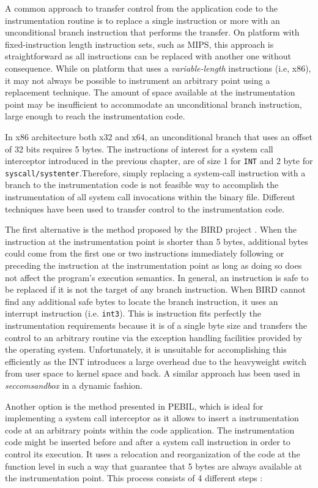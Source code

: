 
A common approach to transfer control from the application code to the instrumentation routine is to replace a single instruction or more with an unconditional branch instruction that performs the transfer. On platform with fixed-instruction length instruction sets, such as MIPS, this approach is straightforward as all instructions can be replaced with another one without consequence. While on platform that uses a \emph{variable-length} instructions (i.e, x86), it may not always be possible to instrument an arbitrary point using a replacement technique. The amount of space available at the instrumentation point may be insufficient to accommodate an unconditional branch instruction, large enough to reach the instrumentation code. 

In x86 architecture both x32 and x64, an unconditional branch that uses an offset of 32 bits requires 5 bytes. The instructions of interest for a system call interceptor introduced in the previous chapter, are of size 1 for \lstinline$INT$ and 2 byte for \lstinline$syscall/systenter$.Therefore, simply replacing a system-call instruction with a branch to the instrumentation code is not feasible way to accomplish the instrumentation of all system call invocations  within the binary file. Different techniques have been used to transfer control to the instrumentation code. 

The first alternative is the method proposed by the BIRD project \cite{BIRD}. When the instruction at the instrumentation point is shorter than 5 bytes, additional bytes could come from the first one or two instructions immediately following or preceding the instruction at the instrumentation point as long as doing so does not affect the program’s execution semantics. In general, an instruction is safe to be replaced if it is not the target of any branch instruction. When BIRD cannot find any additional safe bytes to locate the branch instruction, it uses an interrupt instruction (i.e. \lstinline$int3$). This is instruction fits perfectly the instrumentation requirements because it is of a single byte size and transfers the control to an arbitrary routine via the exception handling facilities provided by the operating system. Unfortunately, it is unsuitable for accomplishing this efficiently as the INT introduces a large overhead due to the  heavyweight switch from user space  to kernel space  and back. A similar approach has been used in \emph{seccomsandbox} in a dynamic fashion.

Another option is the method presented in PEBIL\cite{PEBIL}, which is ideal for implementing a system call interceptor as it allows to insert a instrumentation code at an arbitrary points within the code application. The instrumentation code might be inserted before and after a system call instruction in order to control its execution. It uses a relocation and reorganization of the code at the function level in such a way that guarantee that 5 bytes are always available at the instrumentation point. This process consists of 4 different steps : 

